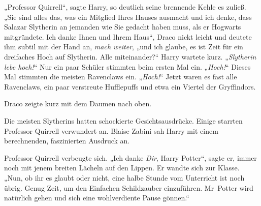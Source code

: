 „Professor Quirrell“, sagte Harry, so deutlich seine brennende Kehle es zuließ. „Sie sind alles das, was ein Mitglied Ihres Hauses ausmacht und ich denke, dass Salazar Slytherin an jemanden wie Sie gedacht haben muss, als er Hogwarts mitgründete. Ich danke Ihnen und Ihrem Haus“, Draco nickt leicht und deutete ihm subtil mit der Hand an, \emph{mach weiter}, „und ich glaube, es ist Zeit für ein dreifaches Hoch auf Slytherin. Alle miteinander?“ Harry wartete kurz. „\emph{Slytherin lebe hoch!}“ Nur ein paar Schüler stimmten beim ersten Mal ein. „\emph{Hoch!}“ Dieses Mal stimmten die meisten Ravenclaws ein. „\emph{Hoch!}“ Jetzt waren es fast alle Ravenclaws, ein paar verstreute Hufflepuffs und etwa ein Viertel der Gryffindors.

Draco zeigte kurz mit dem Daumen nach oben.

Die meisten Slytherins hatten schockierte Gesichtsausdrücke. Einige starrten Professor Quirrell verwundert an. Blaise Zabini sah Harry mit einem berechnenden, faszinierten Ausdruck an.

Professor Quirrell verbeugte sich. „Ich danke \emph{Dir}, Harry Potter“, sagte er, immer noch mit jenem breiten Lächeln auf den Lippen. Er wandte sich zur Klasse. „Nun, ob ihr es glaubt oder nicht, eine halbe Stunde vom Unterricht ist noch übrig. Genug Zeit, um den Einfachen Schildzauber einzuführen. Mr~Potter wird natürlich gehen und sich eine wohlverdiente Pause gönnen.“

